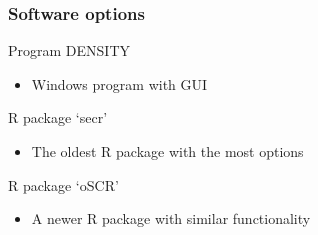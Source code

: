 \documentclass[color=usenames,dvipsnames]{beamer}\usepackage[]{graphicx}\usepackage[]{xcolor}
\begin{document}
\begin{frame}
  \frametitle{Software options}
  Program DENSITY
  \begin{itemize}
    \item Windows program with GUI
  \end{itemize}
  \vfill
  R package `secr'
  \begin{itemize}
    \item The oldest R package with the most options
  \end{itemize}
  \vfill
  R package `oSCR'
  \begin{itemize}
    \item A newer R package with similar functionality
  \end{itemize}
\end{frame}






\end{document}
